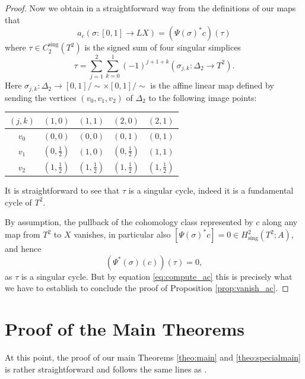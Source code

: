 \documentclass[a4paper,twoside]{article}
\theoremstyle{plain}
\theoremstyle{definition}
\theoremstyle{remark}
\DeclareMathOperator{\sing}{sing}
\begin{document}
\begin{proof}
  Now we obtain in a straightforward way from the  definitions of our maps that
  \begin{equation}\label{eq:compute_ac}
    a_c(\sigma\colon [0,1]\to LX) =(\Psi(\sigma)^*c)(\tau)
  \end{equation}
  where $\tau\in C_2^{\sing}(T^2)$ is the signed sum of four singular simplices
  \begin{equation*}
    \tau = \sum_{j=1}^2\sum_{k=0}^1 (-1)^{j+1+k} (\sigma_{j,k}\colon\Delta_2\to T^2).
  \end{equation*}
   Here   $   \sigma_{j,k}\colon \Delta_2\to [0,1]/\sim\times[0,1]/\sim$
  is the affine linear map defined by sending the vertices $(v_0,v_1,v_2)$ of
  $\Delta_2$ to the following image points:
  \begin{center}
    \begin{tabular}{c|llll}
      $(j,k)$ & $(1,0)$& $(1,1)$& $(2,0)$& $(2,1)$\\\hline
      $v_0$ & $(0,0)$ & $(0,0)$ & $(0,1)$ & $(0,1)$\\
      $v_1$ & $(0,\frac{1}{2})$& $(1,0)$ & $(0,\frac{1}{2})$ & $(1,1)$\\
      $v_2$& $(1,\frac{1}{2})$ & $(1,\frac{1}{2})$ & $(1,\frac{1}{2})$& $(1,\frac{1}{2})$\\
    \end{tabular}
  \end{center}

  
    It is straightforward to see that $\tau$ is a singular cycle, indeed it is
    a fundamental cycle of $T^2$.

    By assumption, the pullback of the cohomology class represented by $c$
    along any map from $T^2$ to $X$ vanishes, in particular also
    $[\Psi(\sigma)^*c]=0\in H^2_{\sing}(T^2;A)$, and hence
    \begin{equation*}
      (\Psi^*(\sigma)(c))(\tau)=0,
    \end{equation*}
    as $\tau$ is a singular cycle. But by equation \eqref{eq:compute_ac} this
    is precisely what we have to establish to conclude the proof of
    Proposition \ref{prop:vanish_ac}.
\end{proof}

\section{Proof of the Main Theorems}

At this point, the proof of our main Theorems \ref{theo:main} and \ref{theo:specialmain} is
rather straightforward and follows the same lines as \cite[Section 4]{GrantMescher}. 
\end{document}
